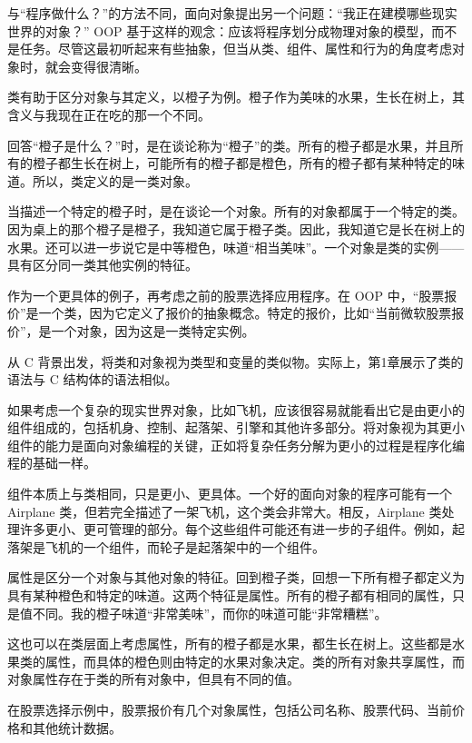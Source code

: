 
与“程序做什么？”的方法不同，面向对象提出另一个问题：“我正在建模哪些现实世界的对象？” OOP 基于这样的观念：应该将程序划分成物理对象的模型，而不是任务。尽管这最初听起来有些抽象，但当从类、组件、属性和行为的角度考虑对象时，就会变得很清晰。


类有助于区分对象与其定义，以橙子为例。橙子作为美味的水果，生长在树上，其含义与我现在正在吃的那一个不同。

回答“橙子是什么？”时，是在谈论称为“橙子”的类。所有的橙子都是水果，并且所有的橙子都生长在树上，可能所有的橙子都是橙色，所有的橙子都有某种特定的味道。所以，类定义的是一类对象。

当描述一个特定的橙子时，是在谈论一个对象。所有的对象都属于一个特定的类。因为桌上的那个橙子是橙子，我知道它属于橙子类。因此，我知道它是长在树上的水果。还可以进一步说它是中等橙色，味道“相当美味”。一个对象是类的实例——具有区分同一类其他实例的特征。

作为一个更具体的例子，再考虑之前的股票选择应用程序。在 OOP 中，“股票报价”是一个类，因为它定义了报价的抽象概念。特定的报价，比如“当前微软股票报价”，是一个对象，因为这是一类特定实例。

从 C 背景出发，将类和对象视为类型和变量的类似物。实际上，第1章展示了类的语法与 C 结构体的语法相似。


如果考虑一个复杂的现实世界对象，比如飞机，应该很容易就能看出它是由更小的组件组成的，包括机身、控制、起落架、引擎和其他许多部分。将对象视为其更小组件的能力是面向对象编程的关键，正如将复杂任务分解为更小的过程是程序化编程的基础一样。

组件本质上与类相同，只是更小、更具体。一个好的面向对象的程序可能有一个 Airplane 类，但若完全描述了一架飞机，这个类会非常大。相反，Airplane 类处理许多更小、更可管理的部分。每个这些组件可能还有进一步的子组件。例如，起落架是飞机的一个组件，而轮子是起落架中的一个组件。


属性是区分一个对象与其他对象的特征。回到橙子类，回想一下所有橙子都定义为具有某种橙色和特定的味道。这两个特征是属性。所有的橙子都有相同的属性，只是值不同。我的橙子味道“非常美味”，而你的味道可能“非常糟糕”。

这也可以在类层面上考虑属性，所有的橙子都是水果，都生长在树上。这些都是水果类的属性，而具体的橙色则由特定的水果对象决定。类的所有对象共享属性，而对象属性存在于类的所有对象中，但具有不同的值。

在股票选择示例中，股票报价有几个对象属性，包括公司名称、股票代码、当前价格和其他统计数据。


